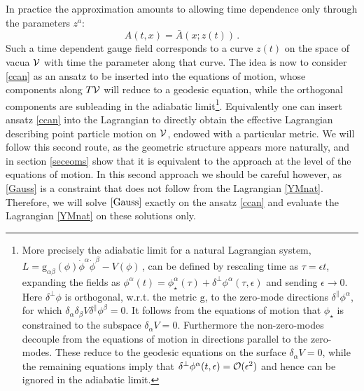 \documentclass[11pt,a4paper]{article}
\def\calo{{\cal O}}
\def\calv{{\cal V}}
\def\rg{{\mathrm{g}}}
\begin{document}
    In practice the approximation amounts to allowing time dependence only through the parameters $z^a$:
    \begin{equation}
    A(t,x)=\bar A(x;z(t))\,.\label{ccan}
    \end{equation}
    Such a time dependent gauge field corresponds to a curve $z(t)$ on the space of vacua $\calv$ with time the parameter along that curve. The idea is now to consider \eqref{ccan} as an ansatz to be inserted into the equations of motion, whose components along $T\calv$ will reduce to a geodesic equation, while the orthogonal components are subleading in the adiabatic limit\footnote{More precisely the adiabatic limit for a natural Lagrangian system, $L=\rg_{\alpha\beta}(\phi)\dot\phi^\alpha\dot\phi^\beta-V(\phi)$\,, can be defined by rescaling time as $\tau=\epsilon t$, expanding the fields as $\phi^\alpha(t)=\phi_{\star}^\alpha(\tau)+\delta^\perp\phi^\alpha(\tau,\epsilon)$ and sending $\epsilon\rightarrow 0$. Here $\delta^\perp\phi$ is orthogonal, w.r.t.\! the metric $\rg$, to the zero-mode directions $\delta^\parallel\phi^\alpha$, for which $\delta_\alpha\delta_\beta V\delta^\parallel\phi^\beta=0$. It follows from the equations of motion that $\phi_\star$ is constrained to the subspace $\delta_\alpha V=0$. Furthermore the non-zero-modes decouple from the equations of motion in directions parallel to the zero-modes. These reduce to the geodesic equations on the surface $\delta_\alpha V=0$, while the remaining equations imply that $\delta^\perp\phi^\alpha(t,\epsilon)=\calo(\epsilon^2)$ and hence can be ignored in the adiabatic limit.\label{adiabatic limit}}. Equivalently one can insert ansatz \eqref{ccan} into the Lagrangian to directly obtain the effective Lagrangian describing point particle motion on $\calv$, endowed with a particular metric. We will follow this second route, as the geometric structure appears more naturally, and in section \ref{seceoms} show that it is equivalent to the approach at the level of the equations of motion. In this second approach we should be careful however, as \eqref{Gauss} is a constraint that does not follow from the Lagrangian \eqref{YMnat}. Therefore, we will solve $\eqref{Gauss}$ exactly on the ansatz \eqref{ccan} and evaluate the Lagrangian \eqref{YMnat} on these solutions only. 
    
    
\end{document}
